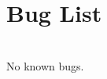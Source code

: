 \chapter{Bug List}
\hypertarget{bug}{}\label{bug}

\begin{DoxyRefList}
\item[File \doxylink{_week3-_demo1-main_8cpp}{Week3-\/\+Demo1-\/main.cpp} ]\hfill \\
\label{bug__bug000001}%
%
No known bugs. 
\end{DoxyRefList}